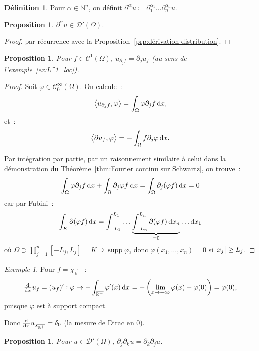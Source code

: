 \documentclass{report}
\DeclareMathOperator{\supp}{supp}
\newcommand{\R}{{\mathbb R}}
\newcommand{\N}{{\mathbb N}}
\newcommand{\scpr}[2]{\left\langle#1, #2\right\rangle}
\newcommand{\pinfty}{{+\infty}}
\newtheorem{prp}[thm]{Proposition}
\theoremstyle{definition}
\newtheorem{déf}[thm]{Définition}
\theoremstyle{remark}
\newtheorem{ex}{Exemple}[chapter]
\begin{document}
\begin{déf} Pour $\alpha \in \N^n$, on définit $\partial^\alpha u \coloneqq \partial_1^{\alpha_1}\ldots\partial_n^{\alpha_n}u$.
\end{déf}

\begin{prp} $\partial^\alpha u \in \mathcal D'(\Omega)$.
\end{prp}

\begin{proof} par récurrence avec la Proposition~\ref{prp:dérivation distribution}.
\end{proof}

\begin{prp} Pour $f \in \mathcal C^1(\Omega)$, $u_{\partial_jf} = \partial_ju_f$ (au sens de l'exemple~\ref{ex:L^1_loc}).
\end{prp}

\begin{proof} Soit $\varphi \in \mathcal C^\infty_0(\Omega)$. On calcule~:
\[\scpr {u_{\partial_jf}}\varphi = \int_\Omega \varphi\partial_jf\dif x,\]
et~:
\[\scpr {\partial u_f}\varphi = -\int_\Omega f\partial_j\varphi\dif x.\]

Par intégration par partie, par un raisonnement similaire à celui dans la démonstration du Théorème~\ref{thm:Fourier continu sur Schwartz}, on trouve~:
\[\int_\Omega\varphi\partial_jf\dif x + \int_\Omega\partial_j\varphi f\dif x = \int_\Omega \partial_j(\varphi f)\dif x = 0\]
car par Fubini~:
\[\int_K\partial(\varphi f)\dif x = \int_{-L_1}^{L_1}\ldots\underbrace {\int_{-L_n}^{L_n}\partial(\varphi f)\dif x_n}_{= 0}\ldots\dif x_1\]
où $\Omega \supset \prod_{j=1}^n [-L_j, L_j] = K \supseteq \supp \varphi$, donc $\varphi(x_1, \ldots, x_n) = 0$ si $\abs {x_j} \geq L_j$.
\end{proof}

\begin{ex} Pour $f = \chi_{\overline {\R^+}}$~:
\[\od {}xu_f = (u_f)' : \varphi \mapsto -\int_{\overline {\R^+}}\varphi'(x)\dif x = -\left(\lim_{x \to \pinfty}\varphi(x) - \varphi(0)\right) = \varphi(0),\]
puisque $\varphi$ est à support compact.

Donc $\od {}xu_{\chi_{\overline {\R^+}}} = \delta_0$ (la mesure de Dirac en 0).
\end{ex}

\begin{prp} Pour $u \in \mathcal D'(\Omega)$, $\partial_j\partial_ku = \partial_k\partial_ju$.
\end{prp}
\end{document}
